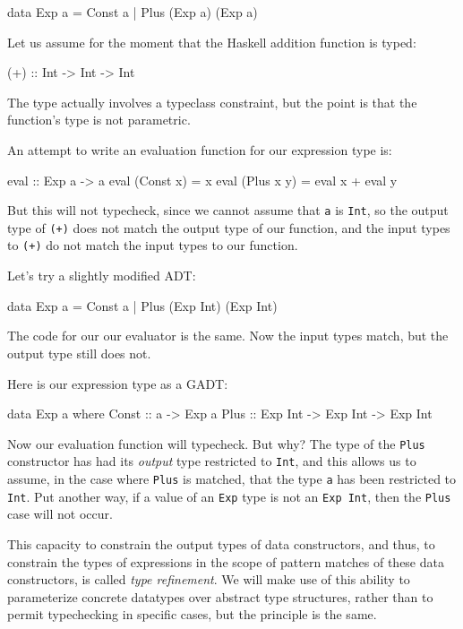 \begin{code}
data Exp a = Const a | Plus (Exp a) (Exp a)
\end{code}

Let us assume for the moment that the Haskell addition function is typed:

\begin{code}
(+) :: Int -> Int -> Int
\end{code}

The type actually involves a typeclass constraint, but the point is that the
function's type is not parametric.

An attempt to write an evaluation function for our expression type is:

\begin{code}
eval :: Exp a -> a
eval (Const x) = x
eval (Plus x y) = eval x + eval y
\end{code}

But this will not typecheck, since we cannot assume that {\tt a} is {\tt Int},
so the output type of {\tt (+)} does not match the output type of our function,
and the input types to {\tt (+)} do not match the input types to our function.

Let's try a slightly modified ADT:

\begin{code}
data Exp a = Const a | Plus (Exp Int) (Exp Int)
\end{code}

The code for our our evaluator is the same. Now the input types match, but
the output type still does not.

Here is our expression type as a GADT:
\begin{code}
data Exp a where
  Const  ::  a -> Exp a
  Plus   :: Exp Int -> Exp Int -> Exp Int
\end{code}

Now our evaluation function will typecheck. But why? The type of the {\tt Plus}
constructor has had its {\em output} type restricted to {\tt Int}, and this
allows us to assume, in the case where {\tt Plus} is matched, that the type
{\tt a} has been restricted to {\tt Int}. Put another way, if a value of an
{\tt Exp} type is not an {\tt Exp Int}, then the {\tt Plus} case will not occur.

This capacity to constrain the output types of data constructors, and thus, to
constrain the types of expressions in the scope of pattern matches of these data
constructors, is called {\em type refinement}. We will make use of this ability
to parameterize concrete datatypes over abstract type structures, rather than to
permit typechecking in specific cases, but the principle is the same.

